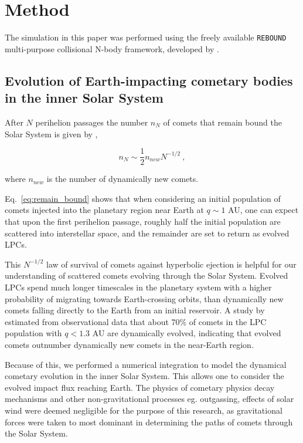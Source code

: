 \chapter{Method}
\label{chap:method}


The simulation in this paper was performed using the freely available \texttt{REBOUND} multi-purpose collisional N-body framework, developed by \citep{2012A&A...537A.128R}.
\section{Evolution of Earth-impacting cometary bodies in the inner Solar System}
\label{method:evol}
After $N$ perihelion passages the number $n_N$ of comets that remain bound the Solar System is given by \citep{1976NASSP.393..445E},

\begin{equation}
    n_N \sim \dfrac{1}{2}n_{new}N^{-1/2}~,
    \label{eq:remain_bound}
\end{equation}

where $n_{new}$ is the number of dynamically new comets.

Eq.~\eqref{eq:remain_bound} shows that when considering an initial population of comets injected into the planetary region near Earth at $q \sim 1$ AU, one can expect that upon the first perihelion passage, roughly half the initial population are scattered into interstellar space, and the remainder are set to return as evolved LPCs.

This $N^{-1/2}$ law of survival of comets against hyperbolic ejection is helpful for our understanding of scattered comets evolving through the Solar System. Evolved LPCs spend much longer timescales in the planetary system with a higher probability of migrating towards Earth-crossing orbits, than dynamically new comets falling directly to the Earth from an initial reservoir. A study by \cite{2012MNRAS.423.1674F} estimated from observational data that about 70\% of comets in the LPC population with $q < 1.3$ AU are dynamically evolved, indicating that evolved comets outnumber dynamically new comets in the near-Earth region. 

Because of this, we performed a numerical integration to model the dynamical cometary evolution in the inner Solar System. This allows one to consider the evolved impact flux reaching Earth. The physics of cometary physics decay mechanisms and other non-gravitational processes eg. outgassing, effects of solar wind were deemed negligible for the purpose of this research, as gravitational forces were taken to most dominant in determining the paths of comets through the Solar System.

